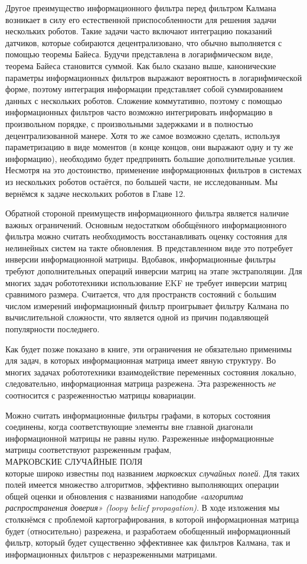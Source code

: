 \documentclass[10pt,a4paper]{article}
\begin{document}
Другое преимущество информационного фильтра перед фильтром Калмана возникает в силу его естественной приспособленности для решения задачи нескольких роботов.  Такие задачи часто включают интеграцию показаний датчиков, которые собираются децентрализовано, что обычно выполняется с помощью теоремы Байеса. Будучи представлена в логарифмическом виде, теорема Байеса становится суммой. Как было сказано выше, канонические параметры информационных фильтров выражают вероятность в логарифмической форме, поэтому интеграция информации представляет собой суммированием данных с нескольких роботов. Сложение коммутативно, поэтому с помощью информационных фильтров часто возможно интегрировать информацию в произвольном порядке, с произвольными задержками и в полностью децентрализованной манере. Хотя то же самое возможно сделать, используя параметризацию в виде моментов (в конце концов, они выражают одну и ту же информацию), необходимо будет предпринять большие дополнительные усилия. Несмотря на это достоинство, применение информационных фильтров в системах из нескольких роботов остаётся, по большей части, не исследованным. Мы вернёмся к задаче нескольких роботов в Главе 12.

Обратной стороной преимуществ информационного фильтра является наличие важных ограничений. Основным недостатком обобщённого информационного фильтра можно считать необходимость восстанавливать оценку состояния для нелинейных систем на такте обновления. В представленном виде это потребует инверсии информационной матрицы. Вдобавок, информационные фильтры требуют дополнительных операций инверсии матриц на этапе экстраполяции. Для многих задач робототехники использование EKF не требует инверсии матриц сравнимого размера. Считается, что для пространств состояний с большим числом измерений информационный фильтр проигрывает фильтру Калмана по вычислительной сложности, что является одной из причин подавляющей популярности последнего. 

Как будет позже показано в книге, эти ограничения не обязательно применимы для задач, в которых информационная матрица имеет явную структуру. Во многих задачах робототехники взаимодействие переменных состояния локально, следовательно, информационная матрица разрежена. Эта разреженность \textit{не} соотносится с разреженностью матрицы ковариации.

Можно считать информационные фильтры  графами, в которых состояния соединены, когда соответствующие элементы вне главной диагонали информационной матрицы не равны нулю. Разреженные информационные матрицы соответствуют разреженным графам,\\
МАРКОВСКИЕ СЛУЧАЙНЫЕ ПОЛЯ \\
которые широко известны под названием \textit{марковских случайных полей}. Для таких полей имеется множество алгоритмов, эффективно выполняющих операции общей оценки и обновления с названиями наподобие \textit{«алгоритма распространения доверия» (loopy belief propagation)}. В ходе изложения мы столкнёмся с проблемой картографирования, в которой информационная матрица будет (относительно) разрежена, и разработаем обобщенный информационный фильтр, который будет существенно эффективнее как  фильтров Калмана, так и информационных фильтров с неразреженными матрицами.\\
\end{document}
